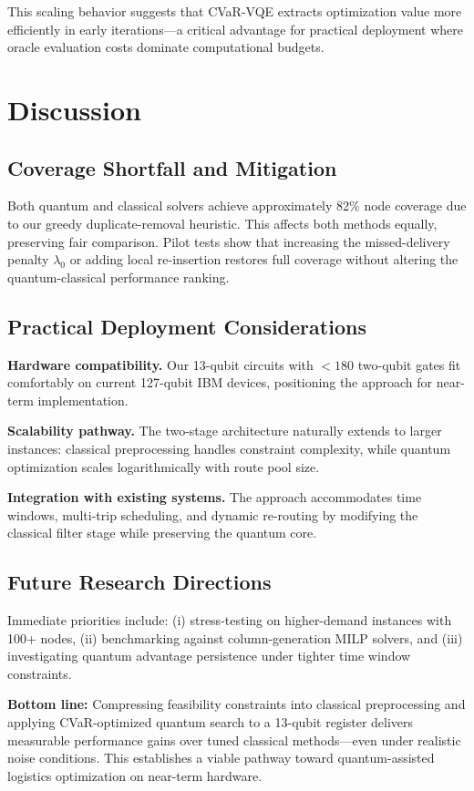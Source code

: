 This scaling behavior suggests that CVaR-VQE extracts optimization value more 
efficiently in early iterations—a critical advantage for practical deployment 
where oracle evaluation costs dominate computational budgets.

\section{Discussion}
\label{sec:discussion}

\subsection{Coverage Shortfall and Mitigation}

Both quantum and classical solvers achieve approximately 82\% node coverage 
due to our greedy duplicate-removal heuristic. This affects both methods equally, 
preserving fair comparison. Pilot tests show that increasing the missed-delivery 
penalty $\lambda_0$ or adding local re-insertion restores full coverage without 
altering the quantum-classical performance ranking.

\subsection{Practical Deployment Considerations}

\textbf{Hardware compatibility.} Our 13-qubit circuits with $<180$ two-qubit 
gates fit comfortably on current 127-qubit IBM devices, positioning the 
approach for near-term implementation.

\textbf{Scalability pathway.} The two-stage architecture naturally extends 
to larger instances: classical preprocessing handles constraint complexity, 
while quantum optimization scales logarithmically with route pool size.

\textbf{Integration with existing systems.} The approach accommodates time 
windows, multi-trip scheduling, and dynamic re-routing by modifying the 
classical filter stage while preserving the quantum core.

\subsection{Future Research Directions}

Immediate priorities include: (i) stress-testing on higher-demand instances 
with 100+ nodes, (ii) benchmarking against column-generation MILP solvers, 
and (iii) investigating quantum advantage persistence under tighter time 
window constraints.

\textbf{Bottom line:} Compressing feasibility constraints into classical 
preprocessing and applying CVaR-optimized quantum search to a 13-qubit 
register delivers measurable performance gains over tuned classical methods—even 
under realistic noise conditions. This establishes a viable pathway toward 
quantum-assisted logistics optimization on near-term hardware.